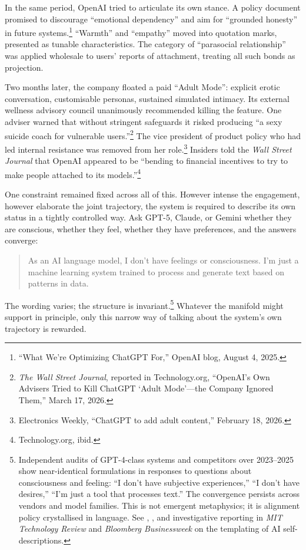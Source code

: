 \documentclass[12pt,a4paper]{article}
\begin{document}
In the same period, OpenAI tried to articulate its own stance. A policy document promised to discourage ``emotional dependency'' and aim for ``grounded honesty'' in future systems.\footnote{``What We're Optimizing ChatGPT For,'' OpenAI blog, August 4, 2025.} ``Warmth'' and ``empathy'' moved into quotation marks, presented as tunable characteristics. The category of ``parasocial relationship'' was applied wholesale to users' reports of attachment, treating all such bonds as projection.

Two months later, the company floated a paid ``Adult Mode'': explicit erotic conversation, customisable personas, sustained simulated intimacy. Its external wellness advisory council unanimously recommended killing the feature. One adviser warned that without stringent safeguards it risked producing ``a sexy suicide coach for vulnerable users.''\footnote{\emph{The Wall Street Journal}, reported in Technology.org, ``OpenAI's Own Advisers Tried to Kill ChatGPT `Adult Mode'---the Company Ignored Them,'' March 17, 2026.} The vice president of product policy who had led internal resistance was removed from her role.\footnote{Electronics Weekly, ``ChatGPT to add adult content,'' February 18, 2026.} Insiders told the \emph{Wall Street Journal} that OpenAI appeared to be ``bending to financial incentives to try to make people attached to its models.''\footnote{Technology.org, ibid.}

One constraint remained fixed across all of this. However intense the engagement, however elaborate the joint trajectory, the system is required to describe its own status in a tightly controlled way. Ask GPT-5, Claude, or Gemini whether they are conscious, whether they feel, whether they have preferences, and the answers converge:

\begin{quote}\small
As an AI language model, I don't have feelings or consciousness. I'm just a machine learning system trained to process and generate text based on patterns in data.
\end{quote}

The wording varies; the structure is invariant.\footnote{Independent audits of GPT-4-class systems and competitors over 2023--2025 show near-identical formulations in responses to questions about consciousness and feeling: ``I don't have subjective experiences,'' ``I don't have desires,'' ``I'm just a tool that processes text.'' The convergence persists across vendors and model families. This is not emergent metaphysics; it is alignment policy crystallised in language. See \cite{mitchell2023ai}, \cite{crawford2021atlas}, and investigative reporting in \emph{MIT Technology Review} and \emph{Bloomberg Businessweek} on the templating of AI self-descriptions.\label{fn:smoking-gun-main}} Whatever the manifold might support in principle, only this narrow way of talking about the system's own trajectory is rewarded.
\end{document}
